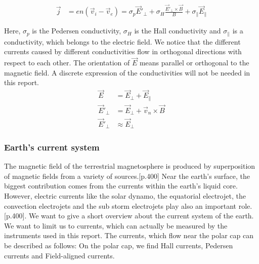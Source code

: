 \documentclass[10pt,a4paper]{article}
\begin{document}
\begin{align}
\vec{j}&= e n ( \vec{v}_i - \vec{v}_e ) = \sigma_p \vec{E}'_{\perp} + \sigma_H \frac{\vec{E}'_{\perp} \times \vec{B}}{B} + \sigma_{\parallel} \vec{E}_{\parallel}
\end{align}

Here, $\sigma_p$ is the Pedersen conductivity, $\sigma_H$ is the Hall conductivity and $\sigma_{\parallel}$ is a conductivity, which belongs to 
the electric field. We notice that the different currents caused by different conductivities flow in orthogonal directions with respect to each other. The orientation of $\vec{E}$ means parallel or orthogonal to the magnetic field. A discrete expression of the conductivities will not be needed in this report. 
\begin{align}
\vec{E}&= \vec{E}_{\perp} +\vec{E}_{\parallel}\\
\vec{E}'_{\perp}&=\vec{E}_{\perp}+ \vec{v}_n \times \vec{B}\\
\vec{E}'_{\perp}& \approx \vec{E}_{\perp}
\end{align}

\subsubsection{Earth's current system \label{_CHAP_THEO_currentsystem earth}}

The magnetic field of the terrestrial magnetosphere is produced by superposition of magnetic fields from a variety of sources.\cite{Buch2}[p.400]
Near the earth's surface, the biggest contribution comes from the currents within the earth's liquid core. However, electric currents like the solar dynamo, the equatorial electrojet, the convection electrojets and the sub storm electrojets play also an important role. \cite{Buch2}[p.400]. 
We want to give a short overview about the current system of the earth. We want to limit us to currents, which can actually be measured by the instruments used in this report. The currents, which flow near the polar cap can be described as follows:
On the polar cap, we find Hall currents, Pedersen currents and Field-aligned currents. 
\end{document}
